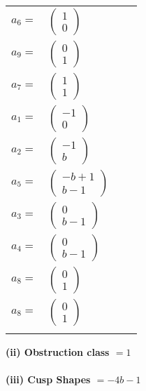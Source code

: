 \documentclass[1p]{elsarticle_modified}
\theoremstyle{definition}
\begin{document}
\begin{tabular}{m{7pt} m{180pt} m{7pt} m{180pt} }
\flushright $a_{6}=$&$\begin{pmatrix}1\\0\end{pmatrix}$ \\
\flushright $a_{9}=$&$\begin{pmatrix}0\\1\end{pmatrix}$ \\
\flushright $a_{7}=$&$\begin{pmatrix}1\\1\end{pmatrix}$ \\
\flushright $a_{1}=$&$\begin{pmatrix}-1\\0\end{pmatrix}$ \\
\flushright $a_{2}=$&$\begin{pmatrix}-1\\b\end{pmatrix}$ \\
\flushright $a_{5}=$&$\begin{pmatrix}- b+1\\b-1\end{pmatrix}$ \\
\flushright $a_{3}=$&$\begin{pmatrix}0\\b-1\end{pmatrix}$ \\
\flushright $a_{4}=$&$\begin{pmatrix}0\\b-1\end{pmatrix}$ \\
\flushright $a_{8}=$&$\begin{pmatrix}0\\1\end{pmatrix}$\\ \flushright $a_{8}=$&$\begin{pmatrix}0\\1\end{pmatrix}$\\&\end{tabular}
\flushleft \textbf{(ii) Obstruction class $= 1$}\\~\\
\flushleft \textbf{(iii) Cusp Shapes $= -4 b-1$}\\~\\
\end{document}
